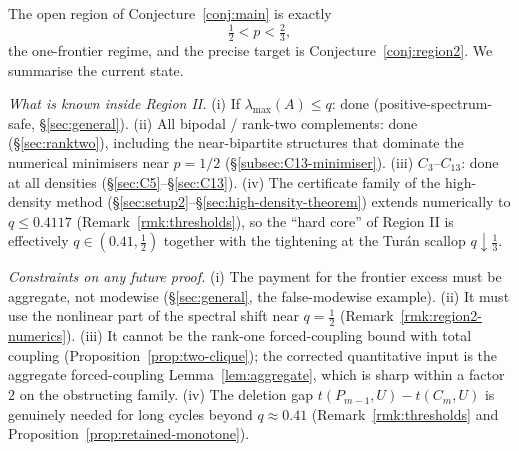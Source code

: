 \documentclass[11pt]{article}
\begin{document}
The open region of Conjecture~\ref{conj:main} is exactly
\[
        \tfrac12<p<\tfrac23,
\]
the one-frontier regime, and the precise target is
Conjecture~\ref{conj:region2}.  We summarise the current state.

\medskip\noindent\emph{What is known inside Region II.}
(i) If $\lambda_{\max}(A)\le q$: done (positive-spectrum-safe,
\S\ref{sec:general}).  (ii) All bipodal / rank-two complements: done
(\S\ref{sec:ranktwo}), including the near-bipartite structures that dominate
the numerical minimisers near $p=1/2$ (\S\ref{subsec:C13-minimiser}).
(iii) $C_3$--$C_{13}$: done at all densities (\S\ref{sec:C5}--\S\ref{sec:C13}).
(iv) The certificate family of the high-density method (\S\ref{sec:setup2}--\S\ref{sec:high-density-theorem}) extends numerically to $q\le0.4117$
(Remark~\ref{rmk:thresholds}), so the ``hard core'' of Region II is
effectively $q\in(0.41,\tfrac12)$ together with the tightening at the Tur\'an
scallop $q\downarrow\tfrac13$.

\medskip\noindent\emph{Constraints on any future proof.}
(i) The payment for the frontier excess must be aggregate, not modewise
(\S\ref{sec:general}, the false-modewise example).  (ii) It must use the
nonlinear part of the spectral shift near $q=\tfrac12$
(Remark~\ref{rmk:region2-numerics}).  (iii) It cannot be the rank-one
forced-coupling bound with total coupling
(Proposition~\ref{prop:two-clique}); the corrected quantitative input is the
aggregate forced-coupling Lemma~\ref{lem:aggregate}, which is sharp within a
factor $2$ on the obstructing family.  (iv) The deletion gap
$t(P_{m-1},U)-t(C_m,U)$ is genuinely needed for long cycles beyond
$q\approx0.41$ (Remark~\ref{rmk:thresholds} and
Proposition~\ref{prop:retained-monotone}).
\end{document}

